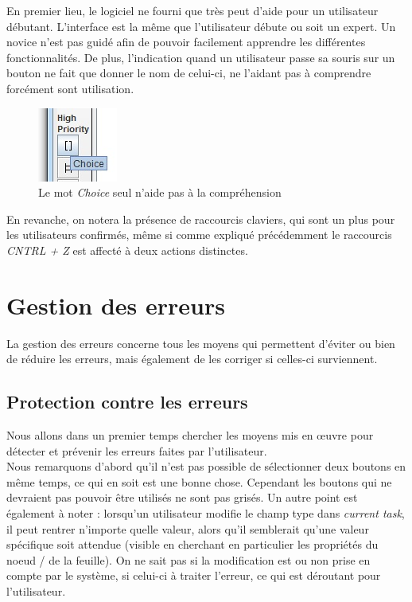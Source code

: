 \documentclass[12pt, a4paper]{article}
\begin{document}
En premier lieu, le logiciel ne fourni que très peut d'aide pour un utilisateur débutant. L'interface est la même que l'utilisateur débute ou soit un expert. Un novice n'est pas guidé afin de pouvoir facilement apprendre les différentes fonctionnalités. De plus, l'indication quand un utilisateur passe sa souris sur un bouton ne fait que donner le nom de celui-ci, ne l'aidant pas à comprendre forcément sont utilisation.
\begin{figure}[h]
\begin{center}
   \includegraphics[scale = 1]{imagebtn.jpg}
	\caption{Le mot \emph{Choice} seul n'aide pas à la compréhension}
	\end{center}
\end{figure}

En revanche, on notera la présence de raccourcis claviers, qui sont un plus pour les utilisateurs confirmés, même si comme expliqué précédemment le raccourcis \emph{CNTRL + Z} est affecté à deux actions distinctes.

\section{Gestion des erreurs}
La gestion des erreurs concerne tous les moyens qui permettent d'éviter ou bien de réduire les erreurs, mais également de les corriger si celles-ci surviennent.

\subsection{Protection contre les erreurs}
Nous allons dans un premier temps chercher les moyens mis en œuvre pour détecter et prévenir les erreurs faites par l'utilisateur. \\


Nous remarquons d'abord qu'il n'est pas possible de sélectionner deux boutons en même temps, ce qui en soit est une bonne chose. Cependant les boutons qui ne devraient pas pouvoir être utilisés ne sont pas grisés. Un autre point est également à noter : lorsqu'un utilisateur modifie le champ type dans \emph{current task}, il peut rentrer n'importe quelle valeur, alors qu'il semblerait qu'une valeur spécifique soit attendue (visible en cherchant en particulier les propriétés du noeud / de la feuille). On ne sait pas si la modification est ou non prise en compte par le système, si celui-ci à traiter l'erreur, ce qui est déroutant pour l'utilisateur.
\newpage
\end{document}
